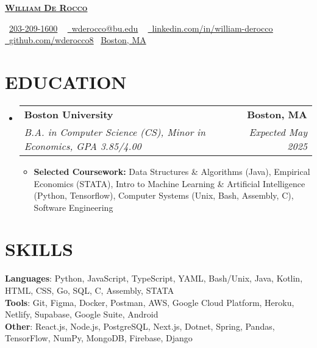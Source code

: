 \documentclass[letterpaper,11pt]{article}
\makeatletter
\newcommand{\resumeItem}[1]{
  \item\small{
    {#1 \vspace{-3pt}}
  }
}
\newcommand{\resumeSubheading}[4]{
  \vspace{-3pt}\item
    \begin{tabular*}{1.0\textwidth}[t]{l@{\extracolsep{\fill}}r}
      \textbf{#1} & \textbf{\small #2} \\
      \textit{\small#3} & \textit{\small #4} \\
    \end{tabular*}\vspace{-7pt}
}
\newcommand{\resumeSubHeadingListStart}{\begin{itemize}[leftmargin=0.0in, label={}]}
\newcommand{\resumeSubHeadingListEnd}{\end{itemize}}
\newcommand{\resumeItemListStart}{\begin{itemize}}
\newcommand{\resumeItemListEnd}
{\end{itemize}\vspace{0pt}}
\makeatother
\begin{document}
    \begin{center}
        {\huge \scshape \textbf{\href{https://william-derocco.netlify.app/}{William De Rocco }}}
        
        \small
        \raisebox{-0.2\height}\faPhone\  \underline{203-209-1600} ~ 
        \href{mailto:wderocco@bu.edu}{\raisebox{-0.2\height}\faEnvelope\  \underline{wderocco@bu.edu}} ~ 
        \href{https://www.linkedin.com/in/william-derocco/}{\raisebox{-0.2\height}\faLinkedin\ \underline{linkedin.com/in/william-derocco}}  ~
        \href{https://www.github.com/wderocco8}{\raisebox{-0.2\height}\faGithub\ \underline{github.com/wderocco8}}
        \raisebox{-0.2\height}\faMapPin \ \underline{Boston, MA}
    \end{center}

\section{EDUCATION}
  \resumeSubHeadingListStart
  
    \resumeSubheading
    {Boston University}{Boston, MA}
    {B.A.  in Computer Science (CS), Minor in Economics, GPA 3.85/4.00}{Expected May 2025}
        \resumeItemListStart
            \resumeItem{\textbf{Selected Coursework:} Data Structures \& Algorithms (Java), Empirical Economics (STATA), Intro to Machine Learning \& Artificial Intelligence (Python, Tensorflow), Computer Systems (Unix, Bash, Assembly, C), Software Engineering}
        \resumeItemListEnd
        
  \resumeSubHeadingListEnd

\section{SKILLS}

    \vspace{-7pt}
    \begin{itemize}
    [leftmargin=0.15in, label={}]\small{\item{
        \textbf{Languages}{: Python, JavaScript, TypeScript, YAML, Bash/Unix, Java, Kotlin, HTML, CSS, Go, SQL, C, Assembly, STATA} \\
        \textbf{Tools}{: Git, Figma, Docker, Postman, AWS, Google Cloud Platform, Heroku, Netlify, Supabase, Google Suite, Android} \\
        \textbf{Other}{: React.js, Node.js, PostgreSQL, Next.js, Dotnet, Spring, Pandas, TensorFlow, NumPy, MongoDB, Firebase, Django} \\}}
    \end{itemize}
\end{document}
